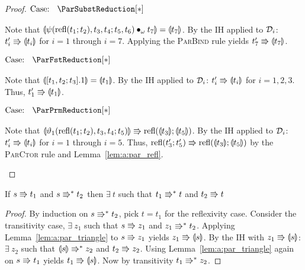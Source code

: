 \begin{proof}
    $\text{Case: }\begin{array}{c} \ParSubstReduction[*] \end{array}$
    \begin{proofcase}
        Note that $\llparenthesis {\psi(\text{refl}(t_1; t_2), t_3, t_4; t_5, t_6) \bullet_{\omega} t_7} \rrparenthesis = \llparenthesis {t_7} \rrparenthesis$.
        By the IH applied to $\mathcal{D}_{i}$: $t_i^\prime \Rrightarrow \llparenthesis {t_i} \rrparenthesis$ for $i = 1$ through $i = 7$.
        Applying the \textsc{ParBind} rule yields $t_7^\prime \Rrightarrow \llparenthesis {t_7} \rrparenthesis$.
    \end{proofcase}

    $\text{Case: }\begin{array}{c} \ParFstReduction[*] \end{array}$
    \begin{proofcase}
        Note that $\llparenthesis {[t_1, t_2; t_3].1} \rrparenthesis = \llparenthesis {t_1} \rrparenthesis$.
        By the IH applied to $\mathcal{D}_{i}$: $t_i^\prime \Rrightarrow \llparenthesis {t_i} \rrparenthesis$ for $i = 1, 2, 3$.
        Thus, $t_1^\prime \Rrightarrow \llparenthesis {t_1} \rrparenthesis$.
    \end{proofcase}

    $\text{Case: }\begin{array}{c} \ParPrmReduction[*] \end{array}$
    \begin{proofcase}
        Note that $\llparenthesis {\vartheta_1(\text{refl}(t_1; t_2), t_3, t_4; t_5)} \rrparenthesis \Rrightarrow \textnormal{refl}(\llparenthesis {t_3} \rrparenthesis; \llparenthesis {t_5} \rrparenthesis)$.
        By the IH applied to $\mathcal{D}_{i}$: $t_i^\prime \Rrightarrow \llparenthesis {t_i} \rrparenthesis$ for $i = 1$ through $i = 5$.
        Thus, $\textnormal{refl}(t_3^\prime;t_5^\prime) \Rrightarrow \textnormal{refl}(\llparenthesis {t_3} \rrparenthesis;\llparenthesis {t_5} \rrparenthesis)$ by the \textsc{ParCtor} rule and Lemma~\ref{lem:a:par_refl}.
    \end{proofcase}
\end{proof}

\begin{lemma}
    \label{lem:a:par_strip}
    If $s \Rrightarrow t_1$ and $s \Rrightarrow^* t_2$ then $\exists\ t$ such that $t_1 \Rrightarrow^* t$ and $t_2 \Rrightarrow t$
\end{lemma}
\begin{proof}
    By induction on $s \Rrightarrow^* t_2$, pick $t = t_1$ for the reflexivity case.
    Consider the transitivity case, $\exists\ z_1$ such that $s \Rrightarrow z_1$ and $z_1 \Rrightarrow^* t_2$.
    Applying Lemma~\ref{lem:a:par_triangle} to $s \Rrightarrow z_1$ yields $z_1 \Rrightarrow \llparenthesis {s} \rrparenthesis$.
    By the IH with $z_1 \Rrightarrow \llparenthesis {s} \rrparenthesis$: $\exists\ z_2$ such that $\llparenthesis {s} \rrparenthesis \Rrightarrow^* z_2$ and $t_2 \Rrightarrow z_2$.
    Using Lemma~\ref{lem:a:par_triangle} again on $s \Rrightarrow t_1$ yields $t_1 \Rrightarrow \llparenthesis {s} \rrparenthesis$.
    Now by transitivity $t_1 \Rrightarrow^* z_2$.
\end{proof}

